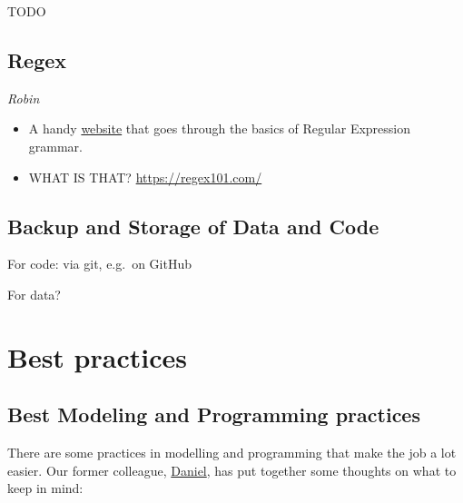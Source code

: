 \documentclass[
]{book}
\begin{document}
TODO

\subsection{Regex}\label{regex}

\emph{Robin}

\begin{itemize}
\item
  A handy
  \href{https://ryanstutorials.net/regular-expressions-tutorial}{website}
  that goes through the basics of Regular Expression grammar.
\item
  WHAT IS THAT? \url{https://regex101.com/}
\end{itemize}

\subsection{Backup and Storage of Data and Code}\label{backup-and-storage-of-data-and-code}

For code: via git, e.g.~on GitHub

For data?

\section{Best practices}\label{best-practices}

\subsection{Best Modeling and Programming practices}\label{best-modeling-and-programming-practices}

There are some practices in modelling and programming that make the job
a lot easier. Our former colleague,
\href{https://www.ufz.de/index.php?en=48991}{Daniel}, has put together some
thoughts on what to keep in mind:
\end{document}
